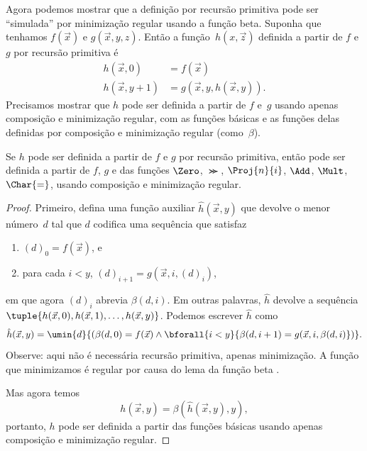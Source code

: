 \documentclass[../../../include/open-logic-section]{subfiles}
\begin{document}

Agora podemos mostrar que a definição por recursão primitiva pode ser
``simulada'' por minimização regular usando a função beta. Suponha que
tenhamos $f(\vec x)$ e $g(\vec x, y, z)$. Então a função~$h(x,\vec z)$
definida a partir de $f$ e~$g$ por recursão primitiva é
\begin{align*}
h(\vec x, 0) & =  f(\vec x) \\
h(\vec x, y+1) & =  g(\vec x, y, h(\vec x, y)).
\end{align*}
Precisamos mostrar que $h$ pode ser definida a partir de $f$ e~$g$
usando apenas composição e minimização regular, com as funções básicas
e as funções delas definidas por composição e minimização regular
(como~$\beta$).

\begin{lem}
Se $h$ pode ser definida a partir de $f$ e $g$ por recursão primitiva,
então pode ser definida a partir de $f$, $g$ e das funções $\Zero$,
$\Succ$, $\Proj{n}{i}$, $\Add$, $\Mult$, $\Char{=}$, usando composição
e minimização regular.
\end{lem}

\begin{proof}
Primeiro, defina uma função auxiliar $\hat h(\vec x, y)$ que devolve o
menor número~$d$ tal que $d$ codifica uma sequência que satisfaz
\begin{enumerate}
\item $(d)_0 = f(\vec x)$, e
\item para cada $i < y$, $(d)_{i+1} = g(\vec x, i, (d)_i)$,
\end{enumerate}
em que agora $(d)_i$ abrevia $\beta(d,i)$. Em outras palavras, $\hat h$
devolve a sequência $\tuple{h(\vec x, 0), h(\vec x, 1), \dots, h(\vec
x, y)}$. Podemos escrever $\hat h$ como
\[
\hat h(\vec x, y) = \umin{d}{(\beta(d,0) = f(\vec x) \land \bforall{i <
  y}{\beta(d,i+1) = g(\vec x, i,\beta(d,i)})}.
\]
Observe: aqui não é necessária recursão primitiva, apenas minimização.
A função que minimizamos é regular por causa do lema da função beta
.

Mas agora temos
\[
h(\vec x, y) = \beta(\hat h(\vec x, y), y),
\]
portanto, $h$ pode ser definida a partir das funções básicas usando
apenas composição e minimização regular.
\end{proof}
\end{document}
